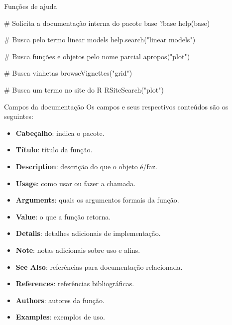 \documentclass[
  ignorenonframetext,
  serif,
  professionalfont,
  usenames,
  dvipsnames,
  aspectratio = 169]{beamer}
\newenvironment{Shaded}{}{}
\newcommand{\CommentTok}[1]{\textcolor[rgb]{0.00,0.50,0.00}{#1}}
\newcommand{\FunctionTok}[1]{#1}
\newcommand{\NormalTok}[1]{#1}
\newcommand{\StringTok}[1]{\textcolor[rgb]{0.00,0.50,0.50}{#1}}
\providecommand{\tightlist}{%
  \setlength{\itemsep}{0pt}\setlength{\parskip}{0pt}}
\renewcommand{\tightlist}{%
  \setlength{\itemsep}{0\baselineskip}
  \setlength{\parskip}{0.25\baselineskip}
}
\renewenvironment{Shaded}{
    \vspace{2pt}
    \begin{tcolorbox}[
      boxrule=0pt,      %
      colframe=gray!10, %
      colback=gray!10,  %
      arc=1em,          %
      sharp corners,
      boxsep=0.5em,     %
      left=3pt, right=3pt, top=3pt, bottom=3pt, %
      grow to left by=0mm,
      grow to right by=6pt,
      ]
    }{
    \end{tcolorbox}
    \vspace{-3pt}
    }
\begin{document}
\begin{frame}[fragile]{Funções de ajuda}
\protect\hypertarget{funuxe7uxf5es-de-ajuda-4}{}
\begin{Shaded}
\begin{Highlighting}[]
\CommentTok{\# Solicita a documentação interna do pacote base}
\NormalTok{?base}
\FunctionTok{help}\NormalTok{(base)}

\CommentTok{\# Busca pelo termo \textquotesingle{}linear models\textquotesingle{}}
\FunctionTok{help.search}\NormalTok{(}\StringTok{"linear models"}\NormalTok{)}

\CommentTok{\# Busca funções e objetos pelo nome parcial}
\FunctionTok{apropos}\NormalTok{(}\StringTok{"plot"}\NormalTok{)}

\CommentTok{\# Busca vinhetas}
\FunctionTok{browseVignettes}\NormalTok{(}\StringTok{"grid"}\NormalTok{)}

\CommentTok{\# Busca um termo no site do R}
\FunctionTok{RSiteSearch}\NormalTok{(}\StringTok{"plot"}\NormalTok{)}
\end{Highlighting}
\end{Shaded}
\end{frame}

\begin{frame}{Campos da documentação}
\protect\hypertarget{campos-da-documentauxe7uxe3o}{}
Os campos e seus respectivos conteúdos são os seguintes:

\begin{itemize}
\tightlist
\item
  \textbf{Cabeçalho}: indica o pacote.
\item
  \textbf{Título}: título da função.
\item
  \textbf{Description}: descrição do que o objeto é/faz.
\item
  \textbf{Usage}: como usar ou fazer a chamada.
\item
  \textbf{Arguments}: quais os argumentos formais da função.
\item
  \textbf{Value}: o que a função retorna.
\item
  \textbf{Details}: detalhes adicionais de implementação.
\item
  \textbf{Note}: notas adicionais sobre uso e afins.
\item
  \textbf{See Also}: referências para documentação relacionada.
\item
  \textbf{References}: referências bibliográficas.
\item
  \textbf{Authors}: autores da função.
\item
  \textbf{Examples}: exemplos de uso.
\end{itemize}
\end{frame}
\end{document}
